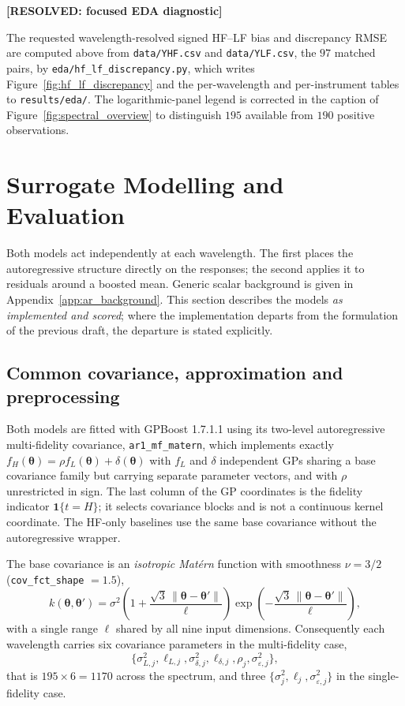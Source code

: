 \documentclass[12pt, letterpaper, oneside]{article}
\newcommand{\resolved}[2]{\par\begingroup\small\color{green!35!black}%
\noindent\textbf{[RESOLVED: #1]}\par\nobreak\noindent #2\par\endgroup}
\begin{document}
\resolved{focused EDA diagnostic}{The requested wavelength-resolved signed
HF--LF bias and discrepancy RMSE are computed above from
\texttt{data/YHF.csv} and \texttt{data/YLF.csv}, the $97$ matched pairs, by
\texttt{eda/hf\_lf\_discrepancy.py}, which writes
Figure~\ref{fig:hf_lf_discrepancy} and the per-wavelength and per-instrument
tables to \texttt{results/eda/}. The
logarithmic-panel legend is corrected in the caption of
Figure~\ref{fig:spectral_overview} to distinguish $195$ available from $190$
positive observations.}

\section{Surrogate Modelling and Evaluation}
\label{sec:surrogate}

Both models act independently at each wavelength. The first places the
autoregressive structure directly on the responses; the second applies it
to residuals around a boosted mean. Generic scalar background is given in
Appendix~\ref{app:ar_background}. This section describes the models
\emph{as implemented and scored}; where the implementation departs from the
formulation of the previous draft, the departure is stated explicitly.

\subsection{Common covariance, approximation and preprocessing}
\label{subsec:common}

Both models are fitted with GPBoost 1.7.1.1 \citep{Sigrist2022gpboosting}
using its two-level autoregressive multi-fidelity covariance,
\texttt{ar1\_mf\_matern}, which implements exactly
$f_H(\bm\theta)=\rho f_L(\bm\theta)+\delta(\bm\theta)$ with $f_L$ and $\delta$
independent GPs sharing a base covariance family but carrying separate
parameter vectors, and with $\rho$ unrestricted in sign. The last column of
the GP coordinates is the fidelity indicator $\mathbf 1\{t=H\}$; it selects
covariance blocks and is not a continuous kernel coordinate. The HF-only
baselines use the same base covariance without the autoregressive wrapper.

The base covariance is an \emph{isotropic Matérn} function with smoothness
$\nu=3/2$ (\texttt{cov\_fct\_shape} $=1.5$),
\begin{equation}
    k(\bm\theta,\bm\theta')=\sigma^2
    \left(1+\frac{\sqrt3\,\|\bm\theta-\bm\theta'\|}{\ell}\right)
    \exp\!\left(-\frac{\sqrt3\,\|\bm\theta-\bm\theta'\|}{\ell}\right),
    \label{eq:matern32}
\end{equation}
with a single range $\ell$ shared by all nine input dimensions. Consequently
each wavelength carries six covariance parameters in the multi-fidelity case,
\begin{equation}
    \{\sigma^2_{L,j},\ell_{L,j},
      \sigma^2_{\delta,j},\ell_{\delta,j},\rho_j,
      \sigma^2_{\varepsilon,j}\},
    \label{eq:implemented-params}
\end{equation}
that is $195\times6=1170$ across the spectrum, and three
$\{\sigma^2_j,\ell_j,\sigma^2_{\varepsilon,j}\}$ in the single-fidelity case.
\end{document}
